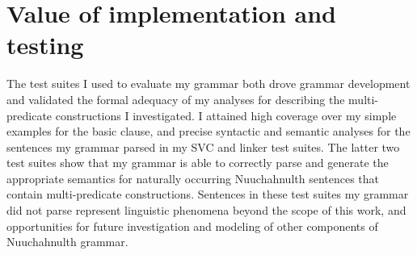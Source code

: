 \section{Value of implementation and testing} \label{ch:results:summary}

The test suites I used to evaluate my grammar both drove grammar development and validated the formal adequacy of my analyses for describing the multi-predicate constructions I investigated. I attained high coverage over my simple examples for the basic clause, and precise syntactic and semantic analyses for the sentences my grammar parsed in my SVC and linker test suites. The latter two test suites show that my grammar is able to correctly parse and generate the appropriate semantics for naturally occurring Nuuchahnulth sentences that contain multi-predicate constructions. Sentences in these test suites my grammar did not parse represent linguistic phenomena beyond the scope of this work, and opportunities for future investigation and modeling of other components of Nuuchahnulth grammar.